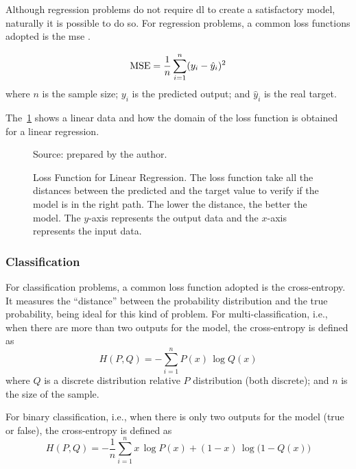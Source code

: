 Although regression problems do not require \gls*{dl} to create a satisfactory model, naturally it is possible to do so.
For regression problems, a common loss functions adopted is the \gls*{mse} \citep{bussab2017}. 

\begin{equation}
    \text{MSE} = \frac{1}{n} \sum_{i=1}^n (y_i - \hat{y}_i)^2
    \label{eq:mse}
\end{equation}
%
where \(n\) is the sample size; \(y_i\) is the predicted output; and \(\hat{y}_i\) is the real target.

The~\cref{fig:mae_chart} shows a linear data and how the domain of the loss function is obtained for a linear regression.
%
\begin{figure}[!htb]
    \centering
    \caption[Loss Function for Linear Regression]{Loss Function for Linear Regression. The loss function take all the distances between the predicted and the target value to verify if the model is in the right path. The lower the distance, the better the model. The \(y\)-axis represents the output data and the \(x\)-axis represents the input data.}
    
    \begin{flushleft}\footnotesize
        Source: prepared by the author.
    \end{flushleft}
    
    \label{fig:mae_chart}
\end{figure}

\subsubsection*{Classification}

For classification problems, a common loss function adopted is the cross-entropy.
It measures the ``distance'' between the probability distribution and the true probability, being ideal for this kind of problem.
For multi-classification, i.e., when there are more than two outputs for the model, the cross-entropy is defined as
%
\begin{equation}
    H(P,Q) = - \sum_{i=1}^n P(x) \, \log Q(x)
    \label{eq:cross_entropy}
\end{equation}
%
where \(Q\) is a discrete distribution relative \(P\) distribution (both discrete); and \(n\) is the size of the sample.

For binary classification, i.e., when there is only two outputs for the model (true or false), the cross-entropy is defined as
%
\begin{equation}
    H(P,Q) = - \frac{1}{n} \sum_{i=1}^n x \, \log P(x) + (1-x) \, \log \Big(1-Q(x)\Big)
    \label{eq:binary_cross_entropy}
\end{equation}

